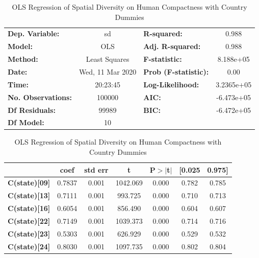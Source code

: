 \documentclass[]{article}
\begin{document}
\begin{table}[h!] 
\begin{center}
\caption{OLS Regression of Spatial Diversity on Human Compactness with
Country Dummies}
\label{table:ols_sd_hc}
\begin{tabular}{lclc}
\toprule
\textbf{Dep. Variable:}    &        sd        & \textbf{  R-squared:         } &     0.988   \\
\textbf{Model:}            &       OLS        & \textbf{  Adj. R-squared:    } &     0.988   \\
\textbf{Method:}           &  Least Squares   & \textbf{  F-statistic:       } & 8.188e+05   \\
\textbf{Date:}             & Wed, 11 Mar 2020 & \textbf{  Prob (F-statistic):} &     0.00    \\
\textbf{Time:}             &     20:23:45     & \textbf{  Log-Likelihood:    } & 3.2365e+05  \\
\textbf{No. Observations:} &      100000      & \textbf{  AIC:               } & -6.473e+05  \\
\textbf{Df Residuals:}     &       99989      & \textbf{  BIC:               } & -6.472e+05  \\
\textbf{Df Model:}         &          10      & \textbf{                     } &             \\
\bottomrule
\end{tabular}
\begin{tabular}{lcccccc}
                      & \textbf{coef} & \textbf{std err} & \textbf{t} & \textbf{P$> |$t$|$} & \textbf{[0.025} & \textbf{0.975]}  \\
\midrule
\textbf{C(state)[09]} &       0.7837  &        0.001     &  1042.069  &         0.000        &        0.782    &        0.785     \\
\textbf{C(state)[13]} &       0.7111  &        0.001     &   993.725  &         0.000        &        0.710    &        0.713     \\
\textbf{C(state)[16]} &       0.6054  &        0.001     &   856.490  &         0.000        &        0.604    &        0.607     \\
\textbf{C(state)[22]} &       0.7149  &        0.001     &  1039.373  &         0.000        &        0.714    &        0.716     \\
\textbf{C(state)[23]} &       0.5303  &        0.001     &   626.929  &         0.000        &        0.529    &        0.532     \\
\textbf{C(state)[24]} &       0.8030  &        0.001     &  1097.735  &         0.000        &        0.802    &        0.804     \\

\end{tabular}
\end{center}
\end{table}
\end{document}

